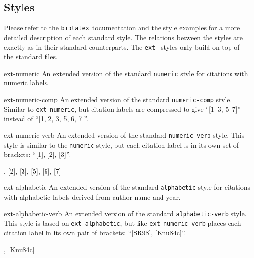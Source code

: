 \documentclass{ltxdockit}
\def\sty{\texttt}
\begin{document}
\subsection{Styles}
Please refer to the \sty{biblatex} documentation%
and the style examples%
for a more detailed description of each standard style.
The relations between the styles are exactly as in their standard counterparts.
The \texttt{ext-} styles only build on top of the standard files.
\begin{marglist}
\item[ext-numeric]
An extended version of the standard \sty{numeric} style for citations with
numeric labels.
\begin{tcolorbox}[]
[1, 2, 3, 5, 7]
\end{tcolorbox}

\item[ext-numeric-comp]
An extended version of the standard \sty{numeric-comp} style.
Similar to \sty{ext-numeric}, but citation labels are
compressed to give \enquote{[1--3, 5--7]} instead of
\enquote{[1, 2, 3, 5, 6, 7]}.
\begin{tcolorbox}[]
[1--3, 5--7]
\end{tcolorbox}

\item[ext-numeric-verb]
An extended version of the standard \sty{numeric-verb} style.
This style is similar to the \sty{numeric} style, but each citation label
is in its own set of brackets: \enquote{[1], [2], [3]}.
\begin{tcolorbox}[]
[1], [2], [3], [5], [6], [7]
\end{tcolorbox}

\item[ext-alphabetic]
An extended version of the standard \sty{alphabetic} style for citations with
alphabetic labels derived from author name and year.
\begin{tcolorbox}[]
[SR98, Knu84c]
\end{tcolorbox}

\item[ext-alphabetic-verb]
An extended version of the standard \sty{alphabetic-verb} style.
This style is based on \sty{ext-alphabetic}, but like
\sty{ext-numeric-verb} places each citation label in its own pair of
brackets: \enquote{[SR98], [Knu84c]}.
\begin{tcolorbox}[]
[SR98], [Knu84c]
\end{tcolorbox}


\end{marglist}
\end{document}
